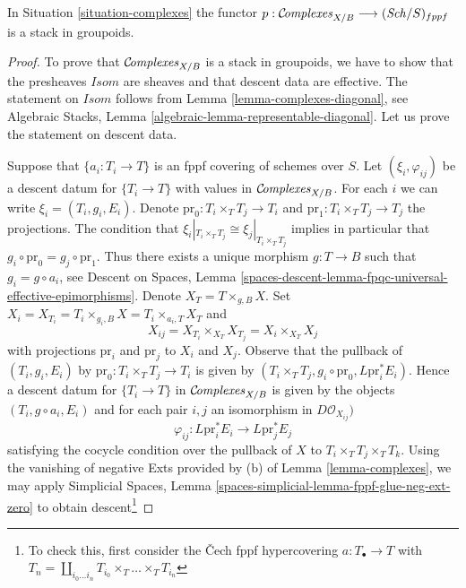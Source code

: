 \begin{lemma}
\label{lemma-complexes-stack}
In Situation \ref{situation-complexes} the functor
$p : \mathcal{C}\!\mathit{omplexes}_{X/B} \longrightarrow (\mathit{Sch}/S)_{fppf}$
is a stack in groupoids.
\end{lemma}

\begin{proof}
To prove that $\mathcal{C}\!\mathit{omplexes}_{X/B}$ is a stack in groupoids,
we have to show that the presheaves $\mathit{Isom}$ are sheaves
and that descent data are effective. The statement on
$\mathit{Isom}$ follows from Lemma \ref{lemma-complexes-diagonal}, see
Algebraic Stacks, Lemma \ref{algebraic-lemma-representable-diagonal}.
Let us prove the statement on descent data.

\medskip\noindent
Suppose that $\{a_i : T_i \to T\}$ is an fppf covering of schemes over $S$.
Let $(\xi_i, \varphi_{ij})$ be a descent datum for $\{T_i \to T\}$
with values in $\mathcal{C}\!\mathit{omplexes}_{X/B}$.
For each $i$ we can write $\xi_i = (T_i, g_i, E_i)$.
Denote $\text{pr}_0 : T_i \times_T T_j \to T_i$ and
$\text{pr}_1 : T_i \times_T T_j \to T_j$ the projections.
The condition that $\xi_i|_{T_i \times_T T_j} \cong \xi_j|_{T_i \times_T T_j}$
implies in particular that $g_i \circ \text{pr}_0 = g_j \circ \text{pr}_1$.
Thus there exists a unique morphism $g : T \to B$ such that
$g_i = g \circ a_i$, see
Descent on Spaces, Lemma
\ref{spaces-descent-lemma-fpqc-universal-effective-epimorphisms}.
Denote $X_T = T \times_{g, B} X$. Set
$X_i = X_{T_i} = T_i \times_{g_i, B} X = T_i \times_{a_i, T} X_T$
and
$$
X_{ij} = X_{T_i} \times_{X_T} X_{T_j} = X_i \times_{X_T} X_j
$$
with projections $\text{pr}_i$ and $\text{pr}_j$ to $X_i$ and $X_j$.
Observe that the pullback of $(T_i, g_i, E_i)$
by $\text{pr}_0 : T_i \times_T T_j \to T_i$ is given by
$(T_i \times_T T_j, g_i \circ \text{pr}_0, L\text{pr}_i^*E_i)$.
Hence a descent datum for $\{T_i \to T\}$ in $\mathcal{C}\!\mathit{omplexes}_{X/B}$
is given by the objects $(T_i, g \circ a_i, E_i)$
and for each pair $i, j$ an isomorphism in
$D\mathcal{O}_{X_{ij}})$
$$
\varphi_{ij} :
L\text{pr}_i^*E_i \longrightarrow L\text{pr}_j^*E_j
$$
satisfying the cocycle condition over the pullback of $X$ to
$T_i \times_T T_j \times_T T_k$.
Using the vanishing of negative Exts provided by (b) of
Lemma \ref{lemma-complexes}, we may apply
Simplicial Spaces, Lemma \ref{spaces-simplicial-lemma-fppf-glue-neg-ext-zero}
to obtain descent\footnote{To check this, first consider the
{\v C}ech fppf hypercovering $a : T_\bullet \to T$ with
$T_n = \coprod_{i_0 \ldots i_n} T_{i_0} \times_T \ldots \times_T T_{i_n}$
}
\end{proof}
